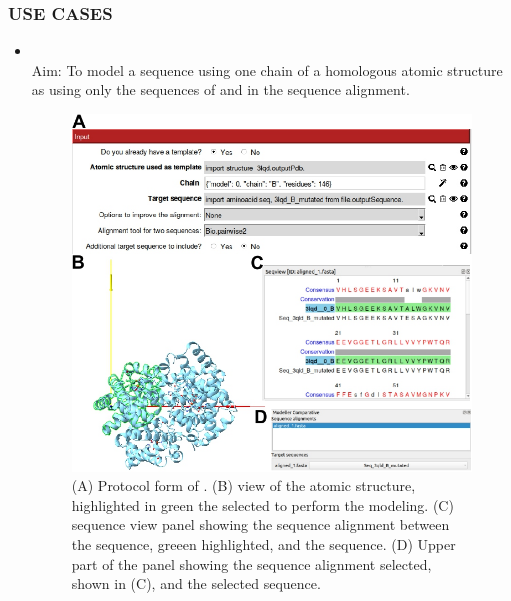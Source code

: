\subsubsection*{USE CASES}
\begin{itemize}
                \item {}\\
                Aim: To model a  sequence using one chain of a homologous atomic structure as  using only the sequences of  and  in the sequence alignment.

                            \begin{figure}[H]
                            \centering 
                            \captionsetup{width=.8\linewidth} 
                            \includegraphics[width=.9\textwidth]{Images_appendix/Fig305.pdf}
                            \caption{(A) Protocol form of . (B) \chimera view of the  atomic structure, highlighted in green the  selected to perform the modeling. (C) \chimera sequence view panel showing the sequence alignment between the   sequence, greeen highlighted, and the  sequence. (D) Upper part of the \chimera {} panel showing the sequence alignment selected, shown in (C), and the selected  sequence.}  
                            \label{fig:app_protocol_seqHomology_2}

\end{figure}
\end{itemize}
